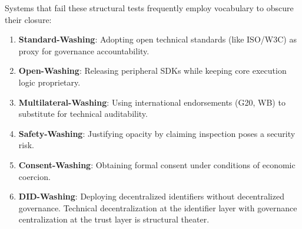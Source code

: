 \documentclass{article}
\begin{document}
Systems that fail these structural tests frequently employ vocabulary to obscure their closure:
\begin{enumerate}
    \item \textbf{Standard-Washing}: Adopting open technical standards (like ISO/W3C) as proxy for governance accountability.
    \item \textbf{Open-Washing}: Releasing peripheral SDKs while keeping core execution logic proprietary.
    \item \textbf{Multilateral-Washing}: Using international endorsements (G20, WB) to substitute for technical auditability.
    \item \textbf{Safety-Washing}: Justifying opacity by claiming inspection poses a security risk.
    \item \textbf{Consent-Washing}: Obtaining formal consent under conditions of economic coercion.
    \item \textbf{DID-Washing}: Deploying decentralized identifiers without decentralized governance. Technical decentralization at the identifier layer with governance centralization at the trust layer is structural theater.
\end{enumerate}
\end{document}
